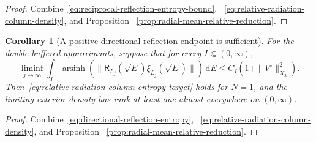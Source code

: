 \documentclass[11pt]{article}
\newcommand{\dd}{\,\mathrm d}
\newtheorem{corollary}[theorem]{Corollary}
\theoremstyle{definition}
\theoremstyle{remark}
\begin{document}
\begin{proof}
Combine~\eqref{eq:reciprocal-reflection-entropy-bound},
~\eqref{eq:relative-radiation-column-density}, and Proposition
~\ref{prop:radial-mean-relative-reduction}.
\end{proof}

\begin{corollary}[A positive directional-reflection endpoint is sufficient]
\label{cor:directional-reflection-endpoint}
For the double-buffered approximants, suppose that for every
$I\Subset(0,\infty)$,
\begin{equation}
 \liminf_{j\to\infty}\int_I
 \operatorname{arsinh}\!\left(
  \|\mathsf R_{L_j}(\sqrt E)\xi_{L_j}(\sqrt E)\|
 \right)\dd E
 \leq C_I\left(1+\|V^\circ\|_{X_3}^2\right).
 \label{eq:directional-reflection-endpoint}
\end{equation}
Then~\eqref{eq:relative-radiation-column-entropy-target} holds for $N=1$, and
the limiting exterior density has rank at least one almost everywhere on
$(0,\infty)$.
\end{corollary}

\begin{proof}
Combine~\eqref{eq:directional-reflection-entropy},
~\eqref{eq:relative-radiation-column-density}, and Proposition
~\ref{prop:radial-mean-relative-reduction}.
\end{proof}
\end{document}
